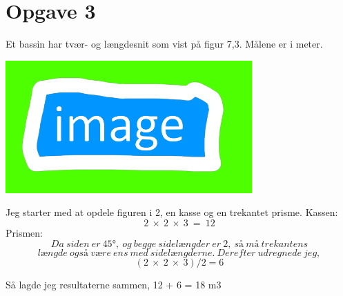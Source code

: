 \documentclass[]{article}
\begin{document}
\section*{Opgave 3}
\textnormal{Et bassin har tvær- og længdesnit som vist på figur 7,3.}
\newline
\phantom{}\hspace{2em}Målene er i meter.
\newline
\begin{center}
\includegraphics{image2.jpg}
\end{center}
Jeg starter med at opdele figuren i 2, en kasse og en trekantet prisme.
\newline
\newline
Kassen:
\vspace{-1.2em}
\[2\:\times\:2\:\times\:3\:=\:12\]
Prismen: 
\vspace{-2.2em}
\[Da\:siden\:er\:45°,\:og\:begge\:sidelængder\:er\:2,\:så\:må\:trekantens\]
\[længde\:også\:være\:ens\:med\:sidelængderne.\:Derefter\:udregnede\:jeg,\]
\[(2\:\times\:2\:\times\:3)/2 = 6\]
\begin{center}
\vspace{-0.5em}
Så lagde jeg resultaterne sammen, 12 + 6 = 18 m3
\end{center}
\end{document}
